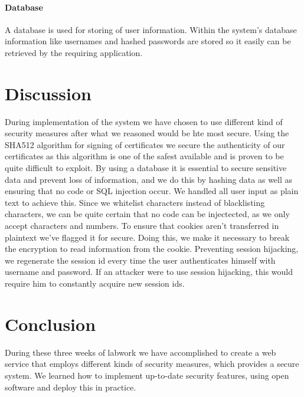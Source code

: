 \documentclass[11pt, a4paper]{article}
\begin{document}
\paragraph{Database}
A database is used for storing of user information. Within the system's database information like usernames and hashed passwords are stored so it easily can be retrieved by the requiring application.

\section{Discussion}
During implementation of the system we have chosen to use different kind of security measures after what we reasoned would be hte most secure. Using the SHA512 algorithm for signing of certificates we secure the authenticity of our certificates as this algorithm is one of the safest available and is proven to be quite difficult to exploit. By using a database it is essential to secure sensitive data and prevent loss of information, and we do this by hashing data as well as ensuring that no code or SQL injection occur. We handled all user input as plain text to achieve this. Since we whitelist characters instead of blacklisting characters, we can be quite certain that no code can be injectected, as we only accept characters and numbers. To ensure that cookies aren't transferred in plaintext we've flagged it for secure. Doing this, we make it necessary to break the encryption to read information from the cookie. Preventing session hijacking, we regenerate the session id every time the user authenticates himself with username and password. If an attacker were to use session hijacking, this would require him to constantly acquire new session ids.
 
\section{Conclusion}
During these three weeks of labwork we have accomplished to create a web service that employs different kinds of security measures, which provides a secure system. We learned how to implement up-to-date security features, using open software and deploy this in practice.  
\end{document}
